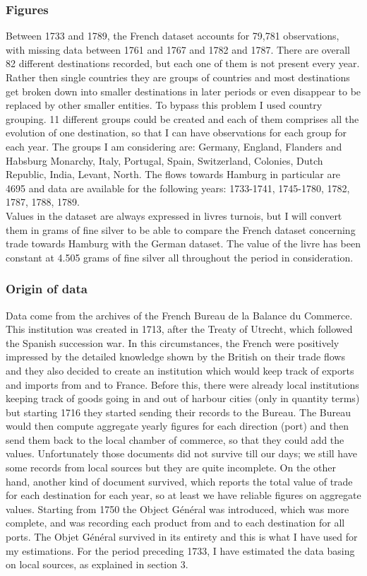 \documentclass[12pt,a4paper,titlepage]{article}
\begin{document}
\subsubsection{Figures}
Between 1733 and 1789, the French dataset accounts for 79,781 observations, with missing data between 1761 and 1767 and 1782 and 1787. There are overall 82 different destinations recorded, but each one of them is not present every year. Rather then single countries they are groups of countries and most destinations get broken down into smaller destinations in later periods or even disappear to be replaced by other smaller entities. To bypass this problem I used country grouping. 11 different groups could be created and each of them comprises all the evolution of one destination, so that I can have observations for each group for each year. The groups I am considering are: Germany, England, Flanders and Habsburg Monarchy, Italy, Portugal, Spain, Switzerland, Colonies, Dutch Republic, India, Levant, North. The flows towards Hamburg in particular are 4695 and data are available for the following years: 1733-1741, 1745-1780, 1782, 1787, 1788, 1789.\\
Values in the dataset are always expressed in livres turnois, but I will convert them in grams of fine silver to be able to compare the French dataset concerning trade towards Hamburg with the German dataset. The value of the livre has been constant at 4.505 grams of fine silver all throughout the period in consideration. 

\subsubsection{Origin of data}
Data come from the archives of the French Bureau de la Balance du Commerce. This institution was created in 1713, after the Treaty of Utrecht, which followed the Spanish succession war. In this circumstances, the French were positively impressed by the detailed knowledge shown by the British on their trade flows and they also decided to create an institution which would keep track of exports and imports from and to France. Before this, there were already local institutions keeping track of goods going in and out of harbour cities (only in quantity terms) but starting 1716 they started sending their records to the Bureau. The Bureau would then compute aggregate yearly figures for each direction (port) and then send them back to the local chamber of commerce, so that they could add the values. Unfortunately those documents did not survive till our days; we still have some records from local sources but they are quite incomplete. On the other hand, another kind of document survived, which reports the total value of trade for each destination for each year, so at least we have reliable figures on aggregate values. Starting from 1750 the Object Général was introduced, which was more complete, and was recording each product from and to each destination for all ports. The Objet Général survived in its entirety and this is what I have used for my estimations. For the period preceding 1733, I have estimated the data basing on local sources, as explained in section 3. 
\end{document}
